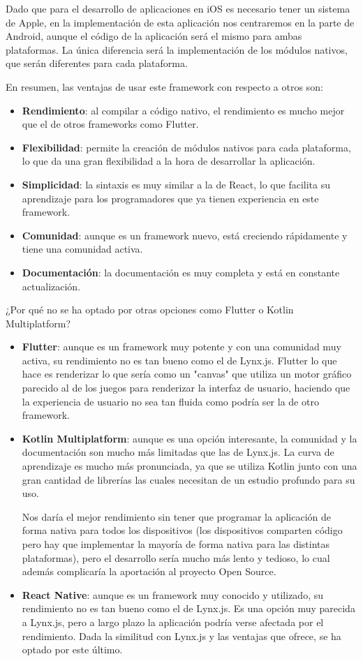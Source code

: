 Dado que para el desarrollo de aplicaciones en iOS es necesario tener un sistema de Apple, en la implementación de esta aplicación nos centraremos en la parte de Android, aunque el código de la aplicación será el mismo para ambas plataformas.
La única diferencia será la implementación de los módulos nativos, que serán diferentes para cada plataforma.

En resumen, las ventajas de usar este framework con respecto a otros son:
\begin{itemize}
    \item \textbf{Rendimiento}: al compilar a código nativo, el rendimiento es mucho mejor que el de otros frameworks como Flutter.
    \item \textbf{Flexibilidad}: permite la creación de módulos nativos para cada plataforma, lo que da una gran flexibilidad a la hora de desarrollar la aplicación.
    \item \textbf{Simplicidad}: la sintaxis es muy similar a la de React, lo que facilita su aprendizaje para los programadores que ya tienen experiencia en este framework.
    \item \textbf{Comunidad}: aunque es un framework nuevo, está creciendo rápidamente y tiene una comunidad activa.
    \item \textbf{Documentación}: la documentación es muy completa y está en constante actualización.
\end{itemize}

¿Por qué no se ha optado por otras opciones como Flutter o Kotlin Multiplatform?
\begin{itemize}
    \item \textbf{Flutter}: aunque es un framework muy potente y con una comunidad muy activa, su rendimiento no es tan bueno como el de Lynx.js. 
        Flutter lo que hace es renderizar lo que sería como un "canvas" que utiliza un motor gráfico parecido al de los juegos para renderizar la interfaz de usuario, haciendo que la experiencia de usuario no sea tan fluida como podría ser la de otro framework. 
    \item \textbf{Kotlin Multiplatform}: aunque es una opción interesante, la comunidad y la documentación son mucho más limitadas que las de Lynx.js. La curva de aprendizaje es mucho más pronunciada, ya que se utiliza Kotlin junto con una gran cantidad de librerías las cuales necesitan de un estudio profundo para su uso.

        Nos daría el mejor rendimiento sin tener que programar la aplicación de forma nativa para todos los dispositivos (los dispositivos comparten código pero hay que implementar la mayoría de forma nativa para las distintas plataformas), pero el desarrollo sería mucho más lento y tedioso, lo cual además complicaría la aportación al proyecto Open Source.
    \item \textbf{React Native}: aunque es un framework muy conocido y utilizado, su rendimiento no es tan bueno como el de Lynx.js.
        Es una opción muy parecida a Lynx.js, pero a largo plazo la aplicación podría verse afectada por el rendimiento.
        Dada la similitud con Lynx.js y las ventajas que ofrece, se ha optado por este último.
\end{itemize}

